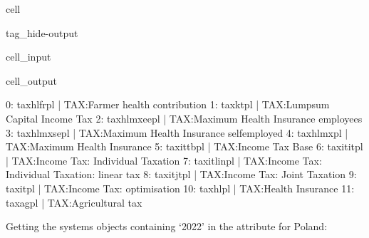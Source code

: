 \documentclass[letterpaper,10pt,english]{sphinxmanual}
\begin{document}
\begin{sphinxuseclass}{cell}
\begin{sphinxuseclass}{tag_hide-output}
\begin{sphinxuseclass}{cell_input}
\begin{sphinxVerbatim}[commandchars=\\\{\}]
\PYG{p}{[}\PYG{p}{]}
\end{sphinxVerbatim}

\end{sphinxuseclass}
\begin{sphinxuseclass}{cell_output}
\begin{sphinxVerbatim}[commandchars=\\\{\}]
0: tax\PYGZus{}hl\PYGZus{}fr\PYGZus{}pl       |    TAX:Farmer health contribution 
1: tax\PYGZus{}kt\PYGZus{}pl          |    TAX:Lump\PYGZhy{}sum Capital Income Tax 
2: tax\PYGZus{}hl\PYGZus{}mx\PYGZus{}ee\PYGZus{}pl    |    TAX:Maximum Health Insurance \PYGZhy{} employees 
3: tax\PYGZus{}hl\PYGZus{}mx\PYGZus{}se\PYGZus{}pl    |    TAX:Maximum Health Insurance \PYGZhy{} self\PYGZhy{}employed 
4: tax\PYGZus{}hl\PYGZus{}mx\PYGZus{}pl       |    TAX:Maximum Health Insurance 
5: tax\PYGZus{}it\PYGZus{}tb\PYGZus{}pl       |    TAX:Income Tax Base 
6: tax\PYGZus{}it\PYGZus{}it\PYGZus{}pl       |    TAX:Income Tax: Individual Taxation 
7: tax\PYGZus{}it\PYGZus{}lin\PYGZus{}pl      |    TAX:Income Tax: Individual Taxation: linear tax 
8: tax\PYGZus{}it\PYGZus{}jt\PYGZus{}pl       |    TAX:Income Tax: Joint Taxation 
9: tax\PYGZus{}it\PYGZus{}pl          |    TAX:Income Tax: optimisation 
10: tax\PYGZus{}hl\PYGZus{}pl         |    TAX:Health Insurance 
11: tax\PYGZus{}ag\PYGZus{}pl         |    TAX:Agricultural tax 
\end{sphinxVerbatim}

\end{sphinxuseclass}
\end{sphinxuseclass}
\end{sphinxuseclass}
\sphinxAtStartPar
Getting the systems objects containing ‘2022’ in the  attribute for Poland:
\end{document}

